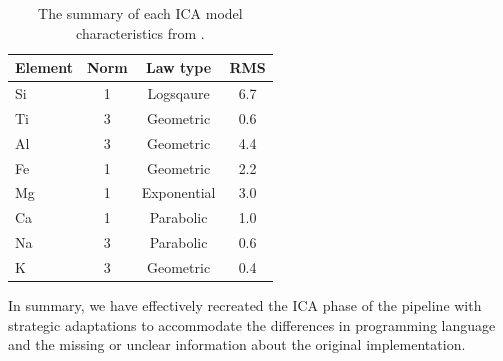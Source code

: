 \begin{table}[h]
\centering
\caption{The summary of each ICA model characteristics from \citeauthor{cleggRecalibrationMarsScience2017}.}
\label{tab:regression_types}
\begin{tabular*}{\columnwidth}{@{\extracolsep{\fill}}lccc}
\toprule
Element & Norm & Law type    & RMS \\ \midrule
Si      & 1    & Logsqaure   & 6.7 \\
Ti      & 3    & Geometric   & 0.6 \\
Al      & 3    & Geometric   & 4.4 \\
Fe      & 1    & Geometric   & 2.2 \\
Mg      & 1    & Exponential & 3.0 \\
Ca      & 1    & Parabolic   & 1.0 \\
Na      & 3    & Parabolic   & 0.6 \\
K       & 3    & Geometric   & 0.4 \\
\bottomrule
\end{tabular*}
\end{table}



In summary, we have effectively recreated the ICA phase of the pipeline with strategic adaptations to accommodate the differences in programming language and the missing or unclear information about the original implementation.


